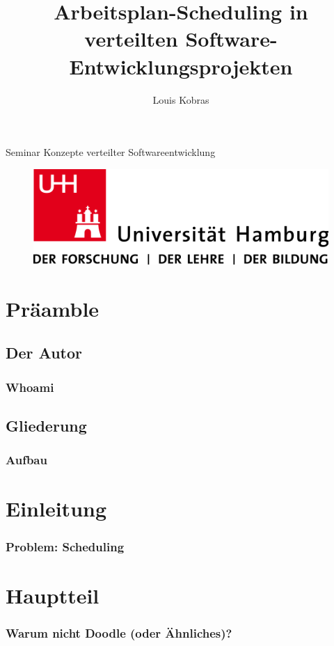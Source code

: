 \documentclass{beamer}
\author{Louis Kobras}
\title{Arbeitsplan-Scheduling in verteilten Software-Entwicklungsprojekten}
\begin{document}
\begin{frame}
	\maketitle
	\vspace{-0.2cm}
	\begin{center}
		Seminar Konzepte verteilter Softwareentwicklung
		\begin{figure}[h]
			\includegraphics[scale=.2]{img/uhh-logo}
		\end{figure}
	\end{center}
\end{frame}

\section{Präamble}
	\subsection{Der Autor}
		\begin{frame}
			\frametitle{Whoami}
		\end{frame}
	\subsection{Gliederung}
		\begin{frame}
			\frametitle{Aufbau}
			\tableofcontents
		\end{frame}

\section{Einleitung}
		\begin{frame}
			\frametitle{Problem: Scheduling}
		\end{frame}
\section{Hauptteil}
		\begin{frame}
			\frametitle{Warum nicht Doodle (oder Ähnliches)?}
		\end{frame}
\end{document}
